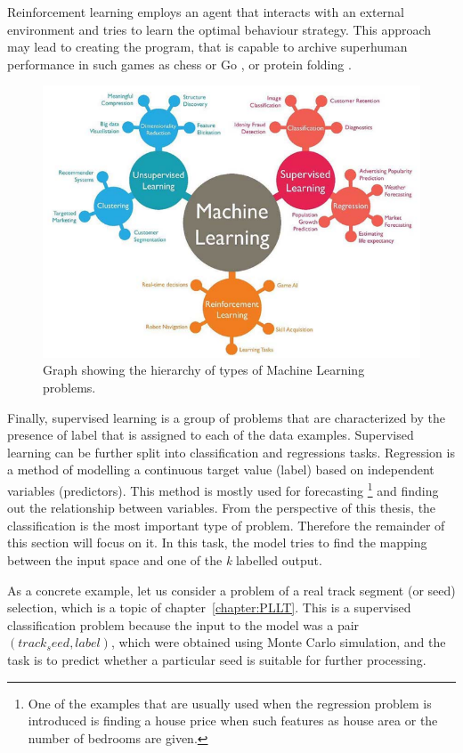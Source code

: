 Reinforcement learning employs an agent that interacts with an external environment and tries to learn the optimal behaviour strategy. This approach may lead to creating the program, that is capable to archive superhuman performance in such games as chess or Go \cite{alphago}, or protein folding \cite{alpha_fold}.   

\begin{figure}[h]
\centering
\includegraphics{figures/ML_types.png}
\caption{Graph showing the hierarchy of types of Machine Learning problems. 
\label{fig:ML_types}}
\end{figure}

Finally, supervised learning is a group of problems that are characterized by the presence of label that is assigned to each of the data examples. Supervised learning can be further split into classification and regressions tasks.
 Regression is a method of modelling a continuous target value (label) based on independent variables (predictors). This method is mostly used for forecasting \footnote{One of the examples that are usually used when the regression problem is introduced is finding a house price when such features as house area or the number of bedrooms are given.} and finding out the relationship between variables. 
 From the perspective of this thesis, the classification is the most important type of problem. Therefore the remainder of this section will focus on it.  In this task, the model tries to find the mapping between the input space and one of the \textit{k} labelled output. 
 
As a concrete example, let us consider a problem of a real track segment (or seed) selection, which is a topic of chapter~\ref{chapter:PLLT}. This is a supervised classification problem because the input to the model was a pair $(track_seed, label)$, which were obtained using Monte Carlo simulation, and the task is to predict whether a particular seed is suitable for further processing.

